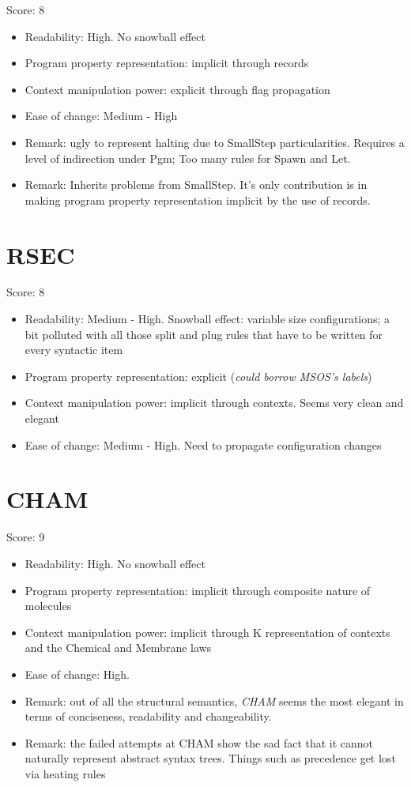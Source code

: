 \documentclass{article}
\begin{document}
	Score: 8
	
	\begin{itemize}
	\item Readability: High. No snowball effect
	\item Program property representation: implicit through records
	\item Context manipulation power: explicit through flag propagation
	\item Ease of change: Medium - High
	\item Remark: ugly to represent halting due to SmallStep particularities. Requires a level of indirection under Pgm; Too many rules for Spawn and Let.
	\item Remark: Inherits problems from SmallStep. It's only contribution is in making program property representation implicit by the use of records.
	\end{itemize}


\section{RSEC}

	Score: 8
	
	\begin{itemize}
	\item Readability: Medium - High. Snowball effect: variable size configurations; a bit polluted with all those split and plug rules that have to be written for every syntactic item
	\item Program property representation: explicit (\textit{could borrow MSOS's labels})
	\item Context manipulation power: implicit through contexts. Seems very clean and elegant
	\item Ease of change: Medium - High. Need to propagate configuration changes
	\end{itemize}


\section{CHAM}

	Score: 9	
	\begin{itemize}	
	\item Readability: High. No snowball effect
	\item Program property representation: implicit through composite nature of molecules
	\item Context manipulation power: implicit through K representation of contexts and the Chemical and Membrane laws
	\item Ease of change: High.
	\item Remark: out of all the structural semantics, \textit{CHAM} seems the most elegant in terms of conciseness, readability and changeability.
	\item Remark: the failed attempts at CHAM show the sad fact that it cannot naturally represent abstract syntax trees. Things such as precedence get lost via heating rules
	\end{itemize}
	
\end{document}
